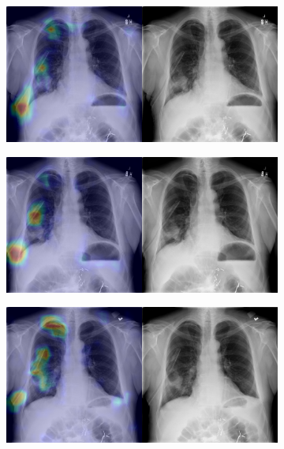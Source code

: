 \begin{figure}[b]
    \centering
    \begin{subfigure}{0.4\textwidth}
        \centering
        \includegraphics[width=1.0\textwidth]{Chapters/5. Conclusiones/img/Pneumothorax/1_1_00000744_005.png}
    \end{subfigure}
    \begin{subfigure}{0.4\textwidth}
        \centering
        \includegraphics[width=1.0\textwidth]{Chapters/5. Conclusiones/img/Pneumothorax/1_1_00000744_006.png}
    \end{subfigure}
    \begin{subfigure}{0.4\textwidth}
        \centering
        \includegraphics[width=1.0\textwidth]{Chapters/5. Conclusiones/img/Pneumothorax/1_1_00000744_007.png}

\end{subfigure}
\end{figure}
